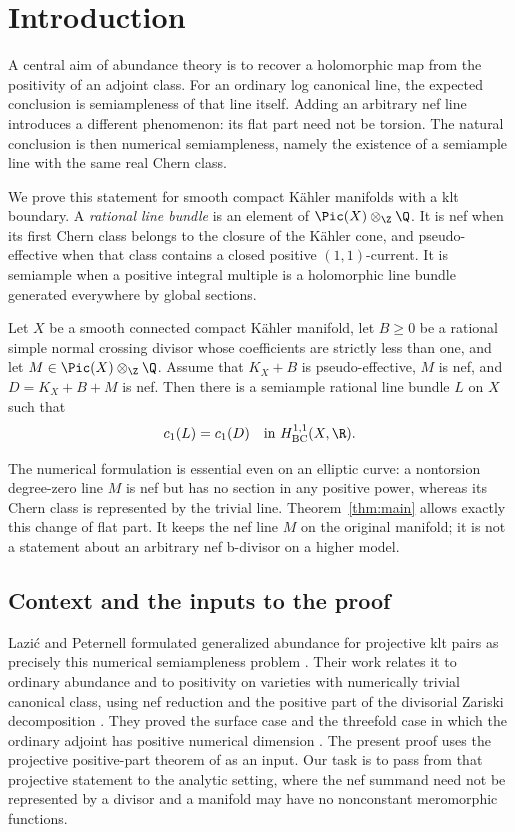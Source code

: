 \section{Introduction}\label{sec:introduction}

A central aim of abundance theory is to recover a holomorphic map from
the positivity of an adjoint class. For an ordinary log canonical line,
the expected conclusion is semiampleness of that line itself.
Adding an arbitrary nef line introduces a different phenomenon: its
flat part need not be torsion. The natural conclusion is then numerical
semiampleness, namely the existence of a semiample line with the same
real Chern class.

We prove this statement for smooth compact K\"ahler manifolds with a
klt boundary. A \emph{rational line bundle} is an element of
\(\Pic(X)\otimes_{\Z}\Q\). It is nef when its first Chern class belongs
to the closure of the K\"ahler cone, and pseudo-effective when that
class contains a closed positive \((1,1)\)-current. It is semiample
when a positive integral multiple is a holomorphic line bundle
generated everywhere by global sections.

\begin{theorem}\label{thm:main}
Let \(X\) be a smooth connected compact K\"ahler manifold, let
\(B\geq0\) be a rational simple normal crossing divisor whose
coefficients are strictly less than one, and let
\(M\in\Pic(X)\otimes_{\Z}\Q\).
Assume that \(K_X+B\) is pseudo-effective, \(M\) is nef, and
\(D=K_X+B+M\) is nef. Then there is a semiample rational line bundle
\(L\) on \(X\) such that
\[
 c_1(L)=c_1(D)\quad\text{in }H^{1,1}_{\mathrm{BC}}(X,\R).
\]
\end{theorem}

The numerical formulation is essential even on an elliptic curve:
a nontorsion degree-zero line \(M\) is nef but has no section in any
positive power, whereas its Chern class is represented by the trivial
line. Theorem~\ref{thm:main} allows exactly this change of flat part.
It keeps the nef line \(M\) on the original manifold; it is not a
statement about an arbitrary nef b-divisor on a higher model.

\subsection{Context and the inputs to the proof}

Lazi\'c and Peternell formulated generalized abundance for projective
klt pairs as precisely this numerical semiampleness problem
\cite[Generalised Abundance Conjecture]{LP1}. Their work relates it to ordinary abundance
and to positivity on varieties with numerically trivial canonical
class, using nef reduction and the positive part of the divisorial
Zariski decomposition \cite{LP1,LP2}. They proved the surface case and
the threefold case in which the ordinary adjoint has positive numerical
dimension \cite[Corollaries~C and~D]{LP1}.
The present proof uses the projective positive-part theorem of
\cite[Proposition~8.1]{P} as an input. Our task is to pass from that
projective statement to the analytic setting, where the nef summand
need not be represented by a divisor and a manifold may have no
nonconstant meromorphic functions.

